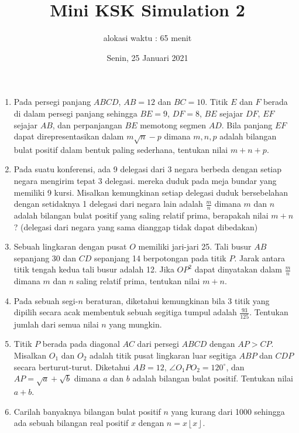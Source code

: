 \documentclass{article}
\title{Mini KSK Simulation 2}
\author{alokasi waktu : 65 menit}
\date{Senin, 25 Januari 2021}
\begin{document}
	\maketitle
	
	\begin{enumerate}
		\item
		Pada persegi panjang $ABCD$, $AB = 12$ dan $BC=10$. Titik $E$ dan $F$ berada di dalam persegi panjang sehingga $BE=9$, $DF=8$, $BE$ sejajar $DF$, $EF$ sejajar $AB$, dan perpanjangan $BE$ memotong segmen $AD$. Bila panjang $EF$ dapat direpresentasikan dalam $m\sqrt n - p$ dimana $m,n,p$ adalah bilangan bulat positif dalam bentuk paling sederhana, tentukan nilai $m+n+p$.
		
		\item
		Pada suatu konferensi, ada 9 delegasi dari 3 negara berbeda dengan setiap negara mengirim tepat 3 delegasi. mereka duduk pada meja bundar yang memiliki 9 kursi. Misalkan kemungkinan setiap delegasi duduk bersebelahan dengan setidaknya 1 delegasi dari negara lain adalah $\frac{m}{n}$ dimana $m$ dan $n$ adalah bilangan bulat positif yang saling relatif prima, berapakah nilai $m+n$? (delegasi dari negara yang sama dianggap tidak dapat dibedakan)
		
		
		\item
		Sebuah lingkaran dengan pusat $O$ memiliki jari-jari 25. Tali busur $AB$ sepanjang 30 dan $CD$ sepanjang 14 berpotongan pada titik $P$. Jarak antara titik tengah kedua tali busur adalah 12. Jika $OP^2$ dapat dinyatakan dalam $\frac{m}{n}$ dimana $m$ dan $n$ saling relatif prima, tentukan nilai $m+n$.
		
		\item
		Pada sebuah segi-$n$ beraturan, diketahui kemungkinan bila 3 titik yang dipilih secara acak membentuk sebuah segitiga tumpul adalah $\frac{93}{125}$. Tentukan jumlah dari semua nilai $n$ yang mungkin.
		
		\item
		Titik $P$ berada pada diagonal $AC$ dari persegi $ABCD$ dengan $AP>CP$. Misalkan $O_1$ dan $O_2$ adalah titik pusat lingkaran luar segitiga $ABP$ dan $CDP$ secara berturut-turut. Diketahui $AB=12$, $\angle O_1PO_2 = 120^\circ$, dan $AP=\sqrt{a}+\sqrt{b}$ dimana $a$ dan $b$ adalah bilangan bulat positif. Tentukan nilai $a+b$.
		
		\item
		Carilah banyaknya bilangan bulat positif $n$ yang kurang dari 1000 sehingga ada sebuah bilangan real positif $x$ dengan $n=x \left \lfloor{x} \right \rfloor$.
		

\end{enumerate}
\end{document}
